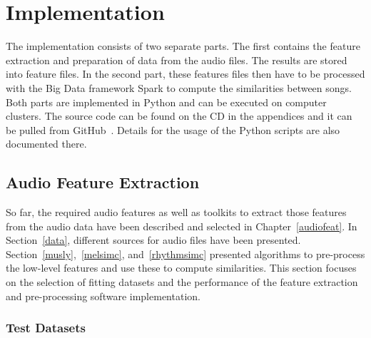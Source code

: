 \chapter{Implementation}\label{implementationdet}

The implementation consists of two separate parts. The first contains the feature extraction and preparation of data from the audio files. The results are stored into feature files. In the second part, these features files then have to be processed with the Big Data framework Spark to compute the similarities between songs.\\ 
Both parts are implemented in Python and can be executed on computer clusters. The source code can be found on the CD in the appendices and it can be pulled from GitHub~\cite{github-code}. Details for the usage of the Python scripts are also documented there.

\section{Audio Feature Extraction}\label{simmet}

So far, the required audio features as well as toolkits to extract those features from the audio data have been described and selected in Chapter~\ref{audiofeat}.
In Section~\ref{data}, different sources for audio files have been presented. Section~\ref{musly},~\ref{melsimc}, and~\ref{rhythmsimc} presented algorithms to pre-process the low-level features and use these to compute similarities. 
This section focuses on the selection of fitting datasets %
and the performance of the feature extraction and pre-processing software implementation.  

\subsection{Test Datasets}\label{tdset}

